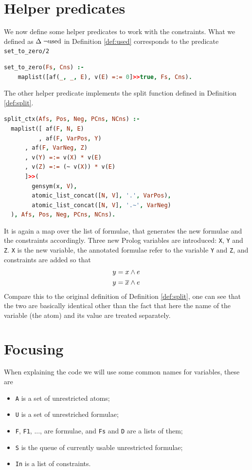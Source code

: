 \documentclass[a4paper, 12pt, tesi, english]{report}
\begin{document}
\section{Helper predicates}\label{sec:helper}
We now define some helper predicates to work with the constraints.
What we defined as $\Delta \; \neg\text{used}$ in Definition \ref{def:used} corresponds to the predicate \texttt{set\_to\_zero/2}
\begin{lstlisting}[language=prolog, numbers=none]
%! set_to_zero(+[AFs], -[Constr]) is det.
set_to_zero(Fs, Cns) :-
    maplist([af(_, _, E), v(E) =:= 0]>>true, Fs, Cns).
\end{lstlisting}

The other helper predicate implements the split function defined in Definition \ref{def:split}.
\begin{lstlisting}[language=prolog, numbers=none]
%! split_ctx(+[AFs], -[AFs], -[AFs], -[Cns], -[Cns]) is det.
split_ctx(Afs, Pos, Neg, PCns, NCns) :-
  maplist([ af(F, N, E)
          , af(F, VarPos, Y)
  	  , af(F, VarNeg, Z)
  	  , v(Y) =:= v(X) * v(E)
  	  , v(Z) =:= (~ v(X)) * v(E)
  	  ]>>(
  	    gensym(x, V),
  	    atomic_list_concat([N, V], '.', VarPos),
  	    atomic_list_concat([N, V], '.~', VarNeg)
  ), Afs, Pos, Neg, PCns, NCns).
\end{lstlisting}
It is again a map over the list of formulae, that generates the new formulae and the constraints accordingly.
Three new Prolog variables are introduced: \texttt{X}, \texttt{Y} and \texttt{Z}.
\texttt{X} is the new variable, the annotated formulae refer to the variable \texttt{Y} and \texttt{Z}, and constraints are added so that
\begin{align*}
	y &= x \wedge e \\
	y &= \overline{x} \wedge e \\
\end{align*}
Compare this to the original definition of Definition \ref{def:split}, one can see that the two are basically identical other than the fact that here the name of the variable (the atom) and its value are treated separately.

\section{Focusing}
When explaining the code we will use some common names for variables, these are
\begin{itemize}
	\item \texttt{A} is a set of unrestricted atoms;
	\item \texttt{U} is a set of unrestriched formulae;
	\item \texttt{F}, \texttt{F1}, ..., are formulae, and \texttt{Fs} and \texttt{D} are a lists of them;
	\item \texttt{S} is the queue of currently usable unrestricted formulae;
	\item \texttt{In} is a list of constraints.
\end{itemize}
\end{document}
